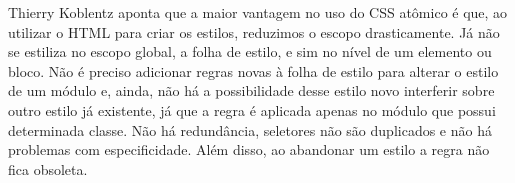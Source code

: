 Thierry Koblentz aponta que a maior vantagem no uso do CSS atômico é
que, ao utilizar o HTML para criar os estilos, reduzimos o escopo
drasticamente. Já não se estiliza no escopo global, a folha de estilo, e
sim no nível de um elemento ou bloco. Não é preciso adicionar regras
novas à folha de estilo para alterar o estilo de um módulo e, ainda, não
há a possibilidade desse estilo novo interferir sobre outro estilo já
existente, já que a regra é aplicada apenas no módulo que possui
determinada classe. Não há redundância, seletores não são duplicados e
não há problemas com especificidade. Além disso, ao abandonar um estilo
a regra não fica obsoleta.


